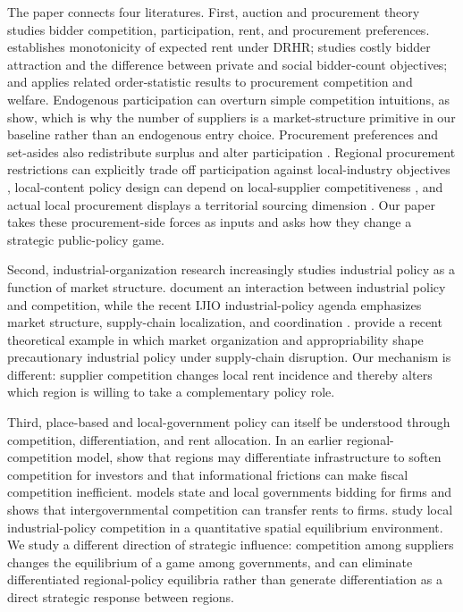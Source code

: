 The paper connects four literatures. First, auction and procurement theory studies bidder competition, participation, rent, and procurement preferences. \citet{Li2005} establishes monotonicity of expected rent under DRHR; \citet{Szech2011} studies costly bidder attraction and the difference between private and social bidder-count objectives; and \citet{XuLi2019} applies related order-statistic results to procurement competition and welfare. Endogenous participation can overturn simple competition intuitions, as \citet{LiZheng2009} show, which is why the number of suppliers is a market-structure primitive in our baseline rather than an endogenous entry choice. Procurement preferences and set-asides also redistribute surplus and alter participation \citep{Vagstad1995,Marion2007,AtheyCoeyLevin2013}. Regional procurement restrictions can explicitly trade off participation against local-industry objectives \citep{SaitoMitsuta2012}, local-content policy design can depend on local-supplier competitiveness \citep{Macatangay2016}, and actual local procurement displays a territorial sourcing dimension \citep{EckersleyEtAl2023}. Our paper takes these procurement-side forces as inputs and asks how they change a strategic public-policy game.

Second, industrial-organization research increasingly studies industrial policy as a function of market structure. \citet{AghionEtAl2015} document an interaction between industrial policy and competition, while the recent IJIO industrial-policy agenda emphasizes market structure, supply-chain localization, and coordination \citep{VanBiesebroeckZhang2026}. \citet{MottaPolo2026} provide a recent theoretical example in which market organization and appropriability shape precautionary industrial policy under supply-chain disruption. Our mechanism is different: supplier competition changes local rent incidence and thereby alters which region is willing to take a complementary policy role.

Third, place-based and local-government policy can itself be understood through competition, differentiation, and rent allocation. In an earlier regional-competition model, \citet{JustmanThisseVanYpersele2005} show that regions may differentiate infrastructure to soften competition for investors and that informational frictions can make fiscal competition inefficient. \citet{Slattery2025} models state and local governments bidding for firms and shows that intergovernmental competition can transfer rents to firms. \citet{LinLi2026} study local industrial-policy competition in a quantitative spatial equilibrium environment. We study a different direction of strategic influence: competition among suppliers changes the equilibrium of a game among governments, and can eliminate differentiated regional-policy equilibria rather than generate differentiation as a direct strategic response between regions.


